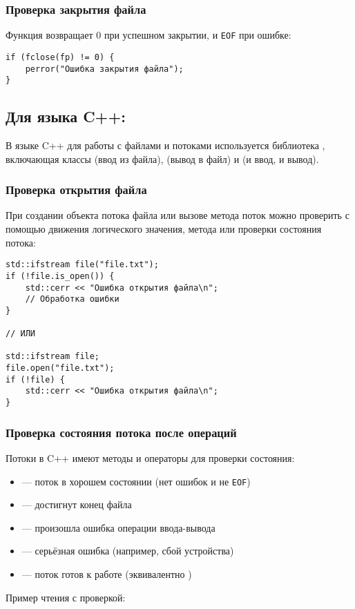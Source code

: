 \subsubsection{Проверка закрытия файла}
Функция  возвращает 0 при успешном закрытии, и \verb|EOF| при ошибке:
\begin{verbatim}
if (fclose(fp) != 0) {
    perror("Ошибка закрытия файла");
}
\end{verbatim}

\subsection{Для языка C++:}
В языке C++ для работы с файлами и потоками используется библиотека , включающая классы 
(ввод из файла),  (вывод в файл) и  (и ввод, и вывод).

\subsubsection{Проверка открытия файла}
При создании объекта потока файла или вызове метода  поток можно проверить с помощью движения логического
значения, метода  или проверки состояния потока:
\begin{verbatim}
std::ifstream file("file.txt");
if (!file.is_open()) {
    std::cerr << "Ошибка открытия файла\n";
    // Обработка ошибки
}

// ИЛИ

std::ifstream file;
file.open("file.txt");
if (!file) {
    std::cerr << "Ошибка открытия файла\n";
}
\end{verbatim}

\subsubsection{Проверка состояния потока после операций}
Потоки в C++ имеют методы и операторы для проверки состояния:
\begin{itemize}
\item {} — поток в хорошем состоянии (нет ошибок и не \verb|EOF|)
\item {} — достигнут конец файла
\item {} — произошла ошибка операции ввода-вывода
\item {} — серьёзная ошибка (например, сбой устройства)
\item {} — поток готов к работе (эквивалентно )
\end{itemize}
Пример чтения с проверкой:

